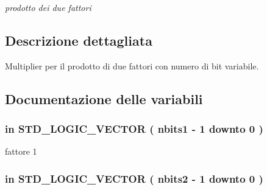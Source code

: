 \begin{DoxyCompactItemize}
\begin{DoxyCompactList}\small\item\em prodotto dei due fattori \end{DoxyCompactList}\end{DoxyCompactItemize}


\subsection{Descrizione dettagliata}
Multiplier per il prodotto di due fattori con numero di bit variabile. 



\subsection{Documentazione delle variabili}
\hypertarget{group___multiplier_gac728adecdbfe10213256c17c1b5c5128}{
\subsubsection[{factor1}]{ {\bfseries \textcolor{vhdlchar}{in}\textcolor{vhdlchar}{ }} {\bfseries \textcolor{vhdlchar}{S\+T\+D\+\_\+\+L\+O\+G\+I\+C\+\_\+\+V\+E\+C\+T\+O\+R}\textcolor{vhdlchar}{ }\textcolor{vhdlchar}{(}\textcolor{vhdlchar}{ }\textcolor{vhdlchar}{ }\textcolor{vhdlchar}{ }\textcolor{vhdlchar}{ }{\bfseries {\bf nbits1}} \textcolor{vhdlchar}{-\/}\textcolor{vhdlchar}{ } \textcolor{vhdldigit}{1} \textcolor{vhdlchar}{ }\textcolor{vhdlchar}{downto}\textcolor{vhdlchar}{ }\textcolor{vhdlchar}{ } \textcolor{vhdldigit}{0} \textcolor{vhdlchar}{ }\textcolor{vhdlchar}{)}\textcolor{vhdlchar}{ }} \hspace{0.3cm}{\ttfamily [Port]}}}\label{group___multiplier_gac728adecdbfe10213256c17c1b5c5128}


fattore 1 

\hypertarget{group___multiplier_gac140852334303b430bbd49689cc689dd}{
\subsubsection[{factor2}]{ {\bfseries \textcolor{vhdlchar}{in}\textcolor{vhdlchar}{ }} {\bfseries \textcolor{vhdlchar}{S\+T\+D\+\_\+\+L\+O\+G\+I\+C\+\_\+\+V\+E\+C\+T\+O\+R}\textcolor{vhdlchar}{ }\textcolor{vhdlchar}{(}\textcolor{vhdlchar}{ }\textcolor{vhdlchar}{ }\textcolor{vhdlchar}{ }\textcolor{vhdlchar}{ }{\bfseries {\bf nbits2}} \textcolor{vhdlchar}{-\/}\textcolor{vhdlchar}{ } \textcolor{vhdldigit}{1} \textcolor{vhdlchar}{ }\textcolor{vhdlchar}{downto}\textcolor{vhdlchar}{ }\textcolor{vhdlchar}{ } \textcolor{vhdldigit}{0} \textcolor{vhdlchar}{ }\textcolor{vhdlchar}{)}\textcolor{vhdlchar}{ }} \hspace{0.3cm}{\ttfamily [Port]}}}\label{group___multiplier_gac140852334303b430bbd49689cc689dd}


